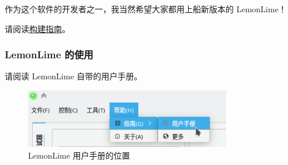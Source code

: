 \documentclass[UTF-8]{ctexart}
\begin{document}
				作为这个软件的开发者之一，我当然希望大家都用上船新版本的 LemonLime！
			
				请阅读\href{https://github.com/Project-LemonLime/Project_LemonLime/blob/master/BUILD.md}{构建指南}。
				
			\subsubsection{LemonLime 的使用}
			
				请阅读 LemonLime 自带的用户手册。
				
				\begin{figure}[H]
					\centering
					\includegraphics[width=0.8\textwidth]{fig/lemonlime_manual.png}
					\caption*{LemonLime 用户手册的位置}
				\end{figure}
				
			
\end{document}

